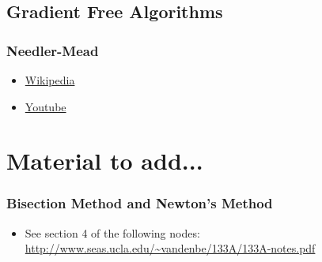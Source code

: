 \section{Gradient Free Algorithms}


\subsection{Needler-Mead}
\begin{resource}
\begin{itemize}
\item \href{https://en.wikipedia.org/wiki/Nelder%E2%80%93Mead_method}{Wikipedia}\\
\item \href{https://youtube/NI3WllrvWoc?t=96}{Youtube}
\end{itemize}
\end{resource}






\chapter{Material to add...}
\subsection{Bisection Method and Newton's Method}
\begin{resource}
\begin{itemize}
\item See section 4 of the following nodes:
\url{http://www.seas.ucla.edu/~vandenbe/133A/133A-notes.pdf}
\end{itemize}
\end{resource}

